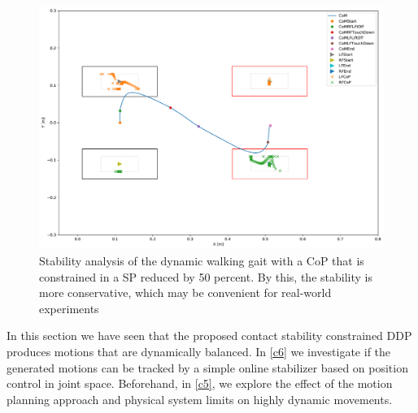 \begin{figure}[h!]
\centering	
\includegraphics[width=.7\textwidth]{fig/walkDynamic/StabilityAnalysis_CoP50}
\caption[Dynamic walking stability analysis with conservative \gls{CoP} restriction]{Stability analysis of the dynamic walking gait with a \gls{CoP} that is constrained in a \gls{SP} reduced by 50 percent. By this, the stability is more conservative, which may be convenient for real-world experiments}
\label{fig:walkDynamic_StabilityCoP50}
\end{figure}

In this section we have seen that the proposed contact stability constrained DDP produces motions that are dynamically balanced. In \cref{c6} we investigate if the generated motions can be tracked by a simple online stabilizer based on position control in joint space. Beforehand, in \cref{c5}, we explore the effect of the motion planning approach and physical system limits on highly dynamic movements.
























